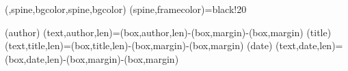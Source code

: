 ({,spine,bgcolor},{spine,bgcolor})%
                {}%
                {(spine,framecolor)={black!20}}

(author){%
  \spine(text,author,len)={\dimexpr\thespine(box,author,len)-\thespine(box,margin)-\thespine(box,margin)}
}{}
(title){%
  \spine(text,title,len)={\dimexpr\thespine(box,title,len)-\thespine(box,margin)-\thespine(box,margin)}
}{}
(date){%
  \spine(text,date,len)={\dimexpr\thespine(box,date,len)-\thespine(box,margin)-\thespine(box,margin)}
}{}


\newcommand{\@spinetextalin}[1]{%
  \raggedright%
  \IfStrEqCase{\thespine(box,#1,align)}{%
    {l}{\raggedright}%
    {c}{\centering}%
    {r}{\raggedleft}%
  }%
}

\newcommand{\@spinetextcolor}[1]{%
  \datamatchtf{\arg}{spine}({box,#1,textcolor},{box,textcolor}){\color{\arg}}{}%
}

